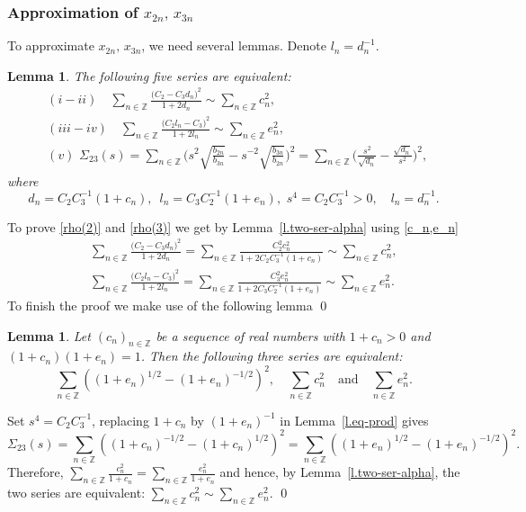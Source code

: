 \documentclass[preprint,12pt]{elsarticle}
\newtheorem{lem}[thm]{Lemma}
\numberwithin{equation}{section}
\begin{document}
\subsubsection{Approximation of $x_{2n},\,x_{3n}$}
%
To approximate $x_{2n},\,x_{3n}$, we need several lemmas.
Denote $l_n=d_n^{-1}$.
%
\begin{lem}
\label{l.light.123} 
The following five series are equivalent:
%
\begin{eqnarray}
\label{rho(2)}
&&(i-ii)\quad \sum_{n\in \mathbb Z}\frac{\big(C_2\!-\!C_3d_{n}\big)^2}{1+2d_n}\sim \sum_{n\in \mathbb Z}c_n^2,\\
\label{rho(3)}
&&(iii-iv)\quad\sum_{n\in \mathbb Z}\frac{\big(C_2l_n\!-\!C_3\big)^2}{1+2l_n}\sim \sum_{n\in \mathbb Z}e_n^2,\\
\label{sigma(23)(s)}
&&(v)\,\,\Sigma_{23}(s)\!=
\!
\sum_{n\in \mathbb Z}\Big(
s^2\sqrt{\frac{b_{2n}}{b_{3n}}}\!-\!
s^{-2}\sqrt{\frac{b_{3n}}{b_{2n}}}\Big)^2\!=
\!\sum_{n\in \mathbb Z}\Big(
\frac{s^2}{\sqrt{d_n}}\!-\!
\frac{\sqrt{d_n}}{s^2}\Big)^2
,\quad
\end{eqnarray}
where 
\begin{equation}
\label{c_n,e_n}
d_n\!=\!
C_2C_3^{-1}(1+c_n),\,\,\,l_n\!=\!C_3C_2^{-1}(1+e_n),\,\,s^4\!=\!C_2C_3^{-1}>0,\quad l_n\!=\!d_n^{-1}.
\end{equation}
\end{lem}
\begin{pf}
To prove  \eqref{rho(2)}  and \eqref{rho(3)} 
we get by Lemma~\ref{l.two-ser-alpha} using \eqref{c_n,e_n}
\begin{eqnarray*}
&&
\sum_{n\in \mathbb Z}\frac{\big(C_2\!-\!C_3d_{n}\big)^2}{1+2d_n}=
\sum_{n\in \mathbb Z}\frac{C_2^2c_n^2}{1+2C_2C_3^{-1}(1+c_n)}
\sim \sum_{n\in \mathbb Z}c_n^2,\\
&&
\sum_{n\in \mathbb Z}\frac{\big(C_2l_n\!-\!C_3\big)^2}{1+2l_n}=
\sum_{n\in \mathbb Z}\frac{C_3^2e_n^2}{1+2C_3C_2^{-1}(1+e_n)}\sim \sum_{n\in \mathbb Z}e_n^2.
\end{eqnarray*}
To finish the proof we make use of the following lemma
\qed\end{pf}
%
\begin{lem}
%
\label{l.2-eq-ser}
Let $(c_n)_{n\in \mathbb Z}$ be a sequence of real numbers 
with $1\!+c_n\!>\!0$ and $(1+c_n)(1+e_n)=1$.
Then the following three  series are equivalent:
$$\sum_{n\in \mathbb Z}
\left((1+e_n)^{1/2}-(1+e_n)^{-1/2} \right)^2,\quad\sum_{n\in \mathbb Z}c_n^2\quad\text{and}\quad \sum_{n\in \mathbb Z}e_n^2.
$$  
\end{lem}
\begin{pf}
 Set $s^4=C_2C_3^{-1}$, replacing $1+c_n$ by $(1+e_n)^{-1}$
in Lemma~\ref{l.eq-prod}  gives
\begin{equation*}
 \Sigma_{23}(s)=
\sum_{n\in \mathbb Z}
\left((1+c_n)^{-1/2}-(1+c_n)^{1/2} \right)^2=
\sum_{n\in \mathbb Z}
\left((1+e_n)^{1/2}-(1+e_n)^{-1/2} \right)^2.
\end{equation*}
Therefore, $\sum_{n\in \mathbb Z}\frac{c_n^2}{1\!+\!c_n}\!=\!\sum_{n\in \mathbb Z}\frac{e_n^2}{1\!+\!e_n}$ and hence,  by Lemma~\ref{l.two-ser-alpha}, the two series are equivalent: $ \sum_{n\in \mathbb Z}c_n^2\!\sim\! \sum_{n\in \mathbb Z}e_n^2$.
\qed\end{pf}
%
\end{document}
